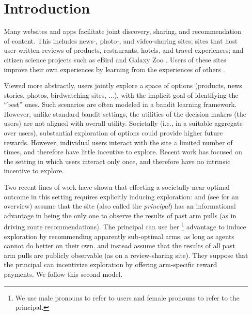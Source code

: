 \section{Introduction} \label{sec:introduction}

Many websites and apps facilitate joint discovery,
sharing, and recommendation of content.
This includes news-, photo-, and video-sharing sites;
sites that host user-written reviews of products, restaurants, hotels, and travel experiences;
and citizen science projects
such as eBird \citep{sullivan2009ebird,xue-ebird} and Galaxy Zoo \citep{lintott-galaxy-zoo}.
Users of these sites improve their own experiences 
by learning from the experiences of others 
\citep{schmit2017human}.

Viewed more abstractly, users jointly explore a space of
options (products, news stories, photos, birdwatching sites,
$\ldots$),
with the implicit goal of identifying the ``best'' ones.
Such scenarios are often modeled in a bandit
learning framework.
However, unlike standard bandit settings, the utilities of the
decision makers (the users) are not aligned with overall utility.
Societally (i.e., in a suitable aggregate over users),
substantial exploration of options could provide higher future rewards.
However, individual users interact with the site a limited number
of times, and therefore have little incentive to explore.
Recent work has focused on the setting in which users interact only once, 
and therefore have no intrinsic incentive to explore.

Two recent lines of work have shown that
effecting a societally near-optimal outcome in this setting requires
explicitly inducing exploration:
\citet{kremer2014implementing}
and
\citet{mansour2015bayesian,mansour2016bayesian,mansour2018competition}
(see \cite{slivkins:asymmetry} for an overview)
assume that the site (also called the \emph{principal}) has an
informational advantage in being the only one to observe the results
of past arm pulls
(as in driving route recommendations).
The principal can use her%
\footnote{We use male pronouns to refer to users and female pronouns
  to refer to the principal.}
advantage to induce exploration by recommending apparently sub-optimal arms,
as long as agents cannot do better on their own.
\citet{frazier2014incentivizing} and 
\citet{han2015incentivizing} instead assume that the results of all
past arm pulls are publicly observable
(as on a review-sharing site).
They suppose that the principal can incentivize exploration by offering arm-specific reward payments.
We follow this second model.

